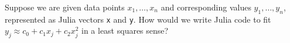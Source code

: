 \documentclass[12pt, leqno]{article}
\begin{document}

Suppose we are given data points $x_1, \ldots, x_n$ and
corresponding values $y_1, \ldots, y_n$, represented as Julia
vectors \verb|x| and \verb|y|.  How would we write Julia code to
fit $y_j \approx c_0 + c_1 x_j + c_2 x_j^2$ in a least squares sense?
\end{document}
